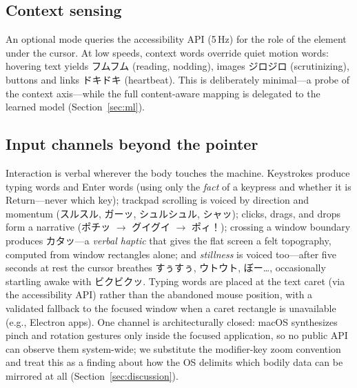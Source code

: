 \documentclass[sigconf,nonacm]{acmart}
\newcommand{\jp}[1]{#1}
\begin{document}
\subsection{Context sensing}
An optional mode queries the accessibility API (5\,Hz) for the role of the element under the cursor. At low speeds, context words override quiet motion words: hovering text yields \jp{フムフム} (reading, nodding), images \jp{ジロジロ} (scrutinizing), buttons and links \jp{ドキドキ} (heartbeat). This is deliberately minimal---a probe of the context axis---while the full content-aware mapping is delegated to the learned model (Section~\ref{sec:ml}).

\subsection{Input channels beyond the pointer}
Interaction is verbal wherever the body touches the machine. Keystrokes produce typing words and Enter words (using only the \emph{fact} of a keypress and whether it is Return---never which key); trackpad scrolling is voiced by direction and momentum (\jp{スルスル}, \jp{ガーッ}, \jp{シュルシュル}, \jp{シャッ}); clicks, drags, and drops form a narrative (\jp{ポチッ} $\rightarrow$ \jp{グイグイ} $\rightarrow$ \jp{ポィ！}); crossing a window boundary produces \jp{カタッ}---a \emph{verbal haptic} that gives the flat screen a felt topography, computed from window rectangles alone; and \emph{stillness} is voiced too---after five seconds at rest the cursor breathes \jp{すぅすぅ}, \jp{ウトウト}, \jp{ぼー…}, occasionally startling awake with \jp{ビクビクッ}. Typing words are placed at the text caret (via the accessibility API) rather than the abandoned mouse position, with a validated fallback to the focused window when a caret rectangle is unavailable (e.g., Electron apps). One channel is architecturally closed: macOS synthesizes pinch and rotation gestures only inside the focused application, so no public API can observe them system-wide; we substitute the modifier-key zoom convention and treat this as a finding about how the OS delimits which bodily data can be mirrored at all (Section~\ref{sec:discussion}).
\end{document}
